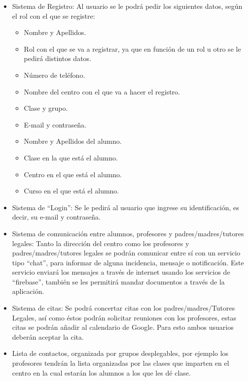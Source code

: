 \begin{itemize}
	\item Sistema de Registro: Al usuario se le podr\'a pedir los siguientes datos, seg\'un el rol con el que se registre:
		\begin{itemize}
			\item Nombre y Apellidos.
			\item Rol con el que se va a registrar, ya que en funci\'on de un rol u otro se le pedir\'a distintos datos.
			\item N\'umero de tel\'efono.
			\item Nombre del centro con el que va a hacer el registro.
			\item Clase y grupo.
			\item E-mail y contrase\~na.
			\item Nombre y Apellidos del alumno.
			\item Clase en la que est\'a el alumno. %
			\item Centro en el que est\'a el alumno.
			\item Curso en el que est\'a el alumno.
		\end{itemize}
	\item Sistema de ``Login'': Se le pedir\'a al usuario que ingrese su identificaci\'on, es decir, su e-mail y contrase\~na.
	\item Sistema de comunicaci\'on entre alumnos, profesores y padres/madres/tutores legales: Tanto la direcci\'on del centro como los profesores y padres/madres/tutores legales se podr\'an comunicar entre s\'i con un servicio tipo ``chat'', para informar de alguna incidencia, mensaje o notificaci\'on. Este servicio enviar\'a los mensajes a trav\'es de internet usando los servicios de ``firebase'', tambi\'en se les permitir\'a mandar documentos a trav\'es de la aplicaci\'on.
	\item Sistema de citas: Se podr\'a concertar citas con los padres/madres/Tutores Legales, as\'i como \'estos podr\'an solicitar reuniones con los profesores, estas citas se podr\'an a\~nadir al calendario de Google. Para esto ambos usuarios deber\'an aceptar la cita.
	\item Lista de contactos, organizada por grupos desplegables, por ejemplo los profesores tendr\'an la lista organizadas por las clases que imparten en el centro en la cual estar\'an los alumnos a los que les d\'e clase.
\end{itemize}

